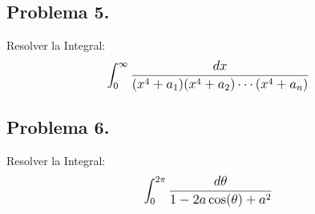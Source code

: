 \begin{CajaTitulo}{\begin{center}\subsection*{Problema 5.}\end{center}}
    Resolver la Integral: \[\mathlarger{\int_{0}^{\infty}\frac{dx}{(x^4 + a_1)(x^4 + a_2)\cdots(x^4 + a_n)}                     }\]

\end{CajaTitulo}

\begin{CajaTitulo}{\begin{center}\subsection*{Problema 6.}\end{center}}
    Resolver la Integral: \[\mathlarger{\int_{0}^{2\pi}\frac{d\theta}{1 - 2a\cos(\theta) + a^2}                 }\]
\end{CajaTitulo}